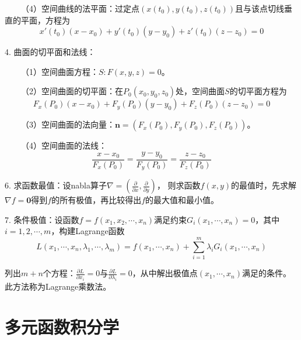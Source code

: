 ~~~~（4）空间曲线的法平面：过定点$\left(x(t_0),y(t_0),z(t_0)\right)$且与该点切线垂直的平面，方程为
\begin{equation*}
    x'(t_0)(x-x_0)+y'(t_0)(y-y_0)+z'(t_0)(z-z_0)=0
\end{equation*}

4. 曲面的切平面和法线：

~~~~（1）空间曲面方程：$S:F(x,y,z)=0$。

~~~~（2）空间曲面的切平面：在$P_0(x_0,y_0,z_0)$处，空间曲面$S$的切平面方程为
\begin{equation*}
    F_x(P_0)(x-x_0)+F_y(P_0)(y-y_0)+F_z(P_0)(z-z_0)=0
\end{equation*}

~~~~（3）空间曲面的法向量：$\mathbf{n}=\left(F_x(P_0),F_y(P_0),F_z(P_0)\right)$。

~~~~（4）空间曲面的法线：
\begin{equation*}
    \frac{x-x_0}{F_x(P_0)}=\frac{y-y_0}{F_y(P_0)}=\frac{z-z_0}{F_z(P_0)}
\end{equation*}

6. 求函数最值：设nabla算子$\nabla =\left(\frac{\partial}{\partial x},\frac{\partial}{\partial y}\right)$，
则求函数$f(x,y)$的最值时，先求解$\nabla f = \mathbf{0}$得到$f$的所有极值，再比较得出$f$的最大值和最小值。


7. 条件极值：设函数$f=f(x_1,x_2,\cdots,x_n)$满足约束$G_i(x_1,\cdots,x_n)=0$，其中$i=1,2,\cdots,m$，构建Lagrange函数
\begin{equation*}
    L(x_1,\cdots,x_n,\lambda_1,\cdots,\lambda_m)=f(x_1,\cdots,x_n)+\sum\limits_{i=1}^m \lambda_iG_i(x_1,\cdots,x_n)
\end{equation*}

列出$m+n$个方程：$\frac{\partial L}{\partial x_i}=0$与$\frac{\partial L}{\partial \lambda_i}=0$，从中解出极值点$(x_1,\cdots,x_n)$满足的条件。此方法称为Lagrange乘数法。

\section{多元函数积分学}

